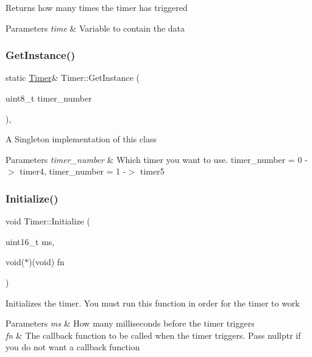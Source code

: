 Returns how many times the timer has triggered 
\begin{DoxyParams}{Parameters}
{\em time} & Variable to contain the data \\
\hline
\end{DoxyParams}
\hypertarget{class_timer_a5a9960ef2a5394a76b4b024cae1a86a3}{}\label{class_timer_a5a9960ef2a5394a76b4b024cae1a86a3} 
\subsubsection{\texorpdfstring{Get\+Instance()}{GetInstance()}}
{\footnotesize\ttfamily static \hyperlink{class_timer}{Timer}\& Timer\+::\+Get\+Instance (\begin{DoxyParamCaption}\item[{uint8\+\_\+t}]{timer\+\_\+number }\end{DoxyParamCaption})\hspace{0.3cm}{\ttfamily [inline]}, {\ttfamily [static]}}

A Singleton implementation of this class 
\begin{DoxyParams}{Parameters}
{\em timer\+\_\+number} & Which timer you want to use. timer\+\_\+number = 0 -\/$>$ timer4, timer\+\_\+number = 1 -\/$>$ timer5 \\
\hline
\end{DoxyParams}
\hypertarget{class_timer_a04ed0eb1468656c271645c2165bbe147}{}\label{class_timer_a04ed0eb1468656c271645c2165bbe147} 
\subsubsection{\texorpdfstring{Initialize()}{Initialize()}}
{\footnotesize\ttfamily void Timer\+::\+Initialize (\begin{DoxyParamCaption}\item[{uint16\+\_\+t}]{ms,  }\item[{void($\ast$)(void)}]{fn }\end{DoxyParamCaption})}

Initializes the timer. You must run this function in order for the timer to work 
\begin{DoxyParams}{Parameters}
{\em ms} & How many milliseconds before the timer triggers \\
\hline
{\em fn} & The callback function to be called when the timer triggers. Pass nullptr if you do not want a callback function \\
\hline
\end{DoxyParams}
\hypertarget{class_timer_a4e607b129b392c11adddd9641a320436}{}\label{class_timer_a4e607b129b392c11adddd9641a320436} 
